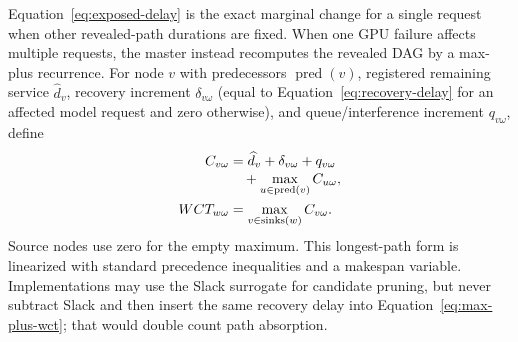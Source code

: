 Equation~\ref{eq:exposed-delay} is the exact marginal change for a single
request when other revealed-path durations are fixed.  When one GPU failure
affects multiple requests, the master instead recomputes the revealed DAG by a
max-plus recurrence.  For node $v$ with predecessors $\operatorname{pred}(v)$,
registered remaining service $\widehat d_v$, recovery increment
$\delta_{v\omega}$ (equal to Equation~\ref{eq:recovery-delay} for an affected
model request and zero otherwise), and queue/interference increment
$q_{v\omega}$, define
\begin{align}
  C_{v\omega}
    &=\widehat d_v+\delta_{v\omega}+q_{v\omega}\notag\\[-2pt]
    &\quad+\max_{u\in\operatorname{pred}(v)}C_{u\omega},\notag\\
  WCT_{w\omega}
    &=\max_{v\in\operatorname{sinks}(w)}C_{v\omega}.
  \label{eq:max-plus-wct}
\end{align}
Source nodes use zero for the empty maximum.  This longest-path form is
linearized with standard precedence inequalities and a makespan variable.
Implementations may use the Slack surrogate for candidate pruning, but never
subtract Slack and then insert the same recovery delay into
Equation~\ref{eq:max-plus-wct}; that would double count path absorption.

